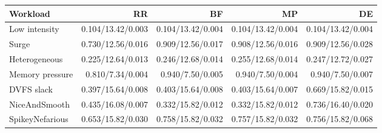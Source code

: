 \begin{tabular}{lrrrr}
\toprule
Workload & RR & BF & MP & DE \\
\midrule
Low intensity & 0.104/13.42/0.003 & 0.104/13.42/0.004 & 0.104/13.42/0.004 & 0.104/13.42/0.004 \\
Surge & 0.730/12.56/0.016 & 0.909/12.56/0.017 & 0.908/12.56/0.016 & 0.909/12.56/0.028 \\
Heterogeneous & 0.225/12.64/0.013 & 0.246/12.68/0.014 & 0.255/12.68/0.014 & 0.247/12.72/0.027 \\
Memory pressure & 0.810/7.34/0.004 & 0.940/7.50/0.005 & 0.940/7.50/0.004 & 0.940/7.50/0.007 \\
DVFS slack & 0.397/15.64/0.008 & 0.403/15.64/0.008 & 0.403/15.64/0.007 & 0.669/15.82/0.015 \\
NiceAndSmooth & 0.435/16.08/0.007 & 0.332/15.82/0.012 & 0.332/15.82/0.012 & 0.736/16.40/0.020 \\
SpikeyNefarious & 0.653/15.82/0.030 & 0.758/15.82/0.032 & 0.757/15.82/0.032 & 0.756/15.82/0.068 \\
\bottomrule
\end{tabular}
